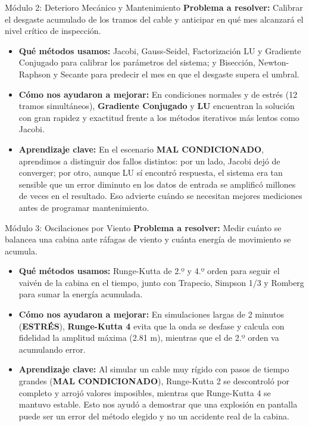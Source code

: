 \documentclass[11pt,a4paper]{article}
\begin{document}
\begin{resumenbox}{Módulo 2: Deterioro Mecánico y Mantenimiento}
\textbf{Problema a resolver:} Calibrar el desgaste acumulado de los tramos del cable y anticipar en qué mes alcanzará el nivel crítico de inspección.
\begin{itemize}[noitemsep]
    \item \textbf{Qué métodos usamos:} Jacobi, Gauss-Seidel, Factorización LU y Gradiente Conjugado para calibrar los parámetros del sistema; y Bisección, Newton-Raphson y Secante para predecir el mes en que el desgaste supera el umbral.
    \item \textbf{Cómo nos ayudaron a mejorar:} En condiciones normales y de estrés (12 tramos simultáneos), \textbf{Gradiente Conjugado} y \textbf{LU} encuentran la solución con gran rapidez y exactitud frente a los métodos iterativos más lentos como Jacobi.
    \item \textbf{Aprendizaje clave:} En el escenario \textbf{MAL CONDICIONADO}, aprendimos a distinguir dos fallos distintos: por un lado, Jacobi dejó de converger; por otro, aunque LU sí encontró respuesta, el sistema era tan sensible que un error diminuto en los datos de entrada se amplificó millones de veces en el resultado. Eso advierte cuándo se necesitan mejores mediciones antes de programar mantenimiento.
\end{itemize}
\end{resumenbox}

\begin{resumenbox}{Módulo 3: Oscilaciones por Viento}
\textbf{Problema a resolver:} Medir cuánto se balancea una cabina ante ráfagas de viento y cuánta energía de movimiento se acumula.
\begin{itemize}[noitemsep]
    \item \textbf{Qué métodos usamos:} Runge-Kutta de 2.º y 4.º orden para seguir el vaivén de la cabina en el tiempo, junto con Trapecio, Simpson 1/3 y Romberg para sumar la energía acumulada.
    \item \textbf{Cómo nos ayudaron a mejorar:} En simulaciones largas de 2 minutos (\textbf{ESTRÉS}), \textbf{Runge-Kutta 4} evita que la onda se desfase y calcula con fidelidad la amplitud máxima (2.81 m), mientras que el de 2.º orden va acumulando error.
    \item \textbf{Aprendizaje clave:} Al simular un cable muy rígido con pasos de tiempo grandes (\textbf{MAL CONDICIONADO}), Runge-Kutta 2 se descontroló por completo y arrojó valores imposibles, mientras que Runge-Kutta 4 se mantuvo estable. Esto nos ayudó a demostrar que una explosión en pantalla puede ser un error del método elegido y no un accidente real de la cabina.
\end{itemize}
\end{resumenbox}
\end{document}
